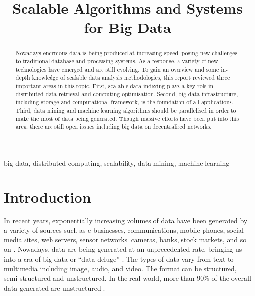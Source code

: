 \documentclass[conference]{IEEEtran}
\begin{document}
\title{Scalable Algorithms and Systems for Big Data\\
}

\author{
}

\maketitle

\begin{abstract}

Nowadays enormous data is being produced at increasing speed, posing new
challenges to traditional database and processing systems. As a
response, a variety of new technologies have emerged and are still
evolving. To gain an overview and some in-depth knowledge of scalable
data analysis methodologies, this report reviewed three important areas
in this topic. First, scalable data indexing plays a key role in
distributed data retrieval and computing optimisation. Second, big data
infrastructure, including storage and computational framework, is the
foundation of all applications. Third, data mining and machine learning
algorithms should be parallelised in order to make the most of data
being generated. Though massive efforts have been put into this area,
there are still open issues including big data on decentralised
networks.

\end{abstract}

\begin{IEEEkeywords}
big data, distributed computing, scalability, data mining, machine learning
\end{IEEEkeywords}

\hypertarget{introduction}{%
\section{Introduction}\label{introduction}}

In recent years, exponentially increasing volumes of data have been
generated by a variety of sources such as e-businesses, communications,
mobile phones, social media sites, web servers, sensor networks,
cameras, banks, stock markets, and so on
\autocite{OUSSOUS2018431,SIVARAJAH2017}. Nowadays, data are being
generated at an unprecedented rate, bringing us into a era of big data
or ``data deluge'' \autocite{SIVARAJAH2017,hu2014}. The types of data
vary from text to multimedia including image, audio, and video. The
format can be structured, semi-structured and unstructured. In the real
world, more than 90\% of the overall data generated are unstructured
\autocite{SIVARAJAH2017}.
\end{document}
